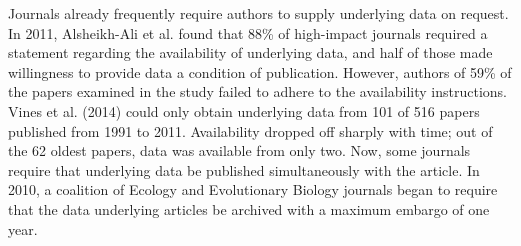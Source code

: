 \documentclass[10pt,a4paper,twocolumn]{article}
\begin{document}
Journals already frequently require authors to supply underlying data on request.
In 2011, Alsheikh-Ali et al. found that 88\% of high-impact journals required a statement regarding the availability of underlying data, and half of those made willingness to provide data a condition of publication\cite{alsheikh-ali_public_2011}.
However, authors of 59\% of the papers examined in the study failed to adhere to the availability instructions.
Vines et al. (2014) could only obtain underlying data from 101 of 516 papers published from 1991 to 2011\cite{vines_availability_2014}.
Availability dropped off sharply with time; out of the 62 oldest papers, data was available from only two.
Now, some journals require that underlying data be published simultaneously with the article.
In 2010, a coalition of Ecology and Evolutionary Biology journals began to require that the data underlying articles be archived with a maximum embargo of one year\cite{whitlock_data_2010, fairbairn_advent_2011}.
\end{document}
